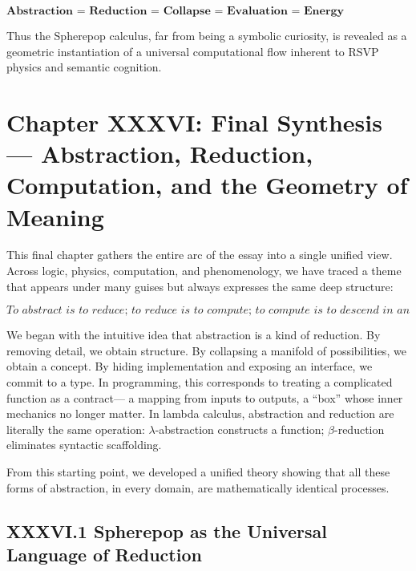 \documentclass[11pt,letterpaper]{article}
\begin{document}
\[
\boxed{
\textbf{
Abstraction = Reduction = Collapse = Evaluation = 
Energy Minimization = Semantic Convergence.}}
\]

Thus the Spherepop calculus, far from being a symbolic curiosity,
is revealed as a geometric instantiation of a universal computational flow
inherent to RSVP physics and semantic cognition.

\newpage

\section{Chapter XXXVI: Final Synthesis —  
Abstraction, Reduction, Computation, and the Geometry of Meaning}

This final chapter gathers the entire arc of the essay into a single unified view.  
Across logic, physics, computation, and phenomenology, we have traced a theme that 
appears under many guises but always expresses the same deep structure:

\[
\boxed{
\textit{To abstract is to reduce;  
to reduce is to compute;  
to compute is to descend in an energy landscape;  
to descend is to align with meaning.}}
\]

We began with the intuitive idea that abstraction is a kind of reduction.  
By removing detail, we obtain structure.  
By collapsing a manifold of possibilities, we obtain a concept.  
By hiding implementation and exposing an interface, we commit to a type.  
In programming, this corresponds to treating a complicated function as a contract—
a mapping from inputs to outputs, a “box” whose inner mechanics no longer matter.
In lambda calculus, abstraction and reduction are literally the same operation:
$\lambda$-abstraction constructs a function; $\beta$-reduction eliminates syntactic scaffolding.

From this starting point, we developed a unified theory showing that all these forms of
abstraction, in every domain, are mathematically identical processes.

\subsection{XXXVI.1 Spherepop as the Universal Language of Reduction}
\end{document}
